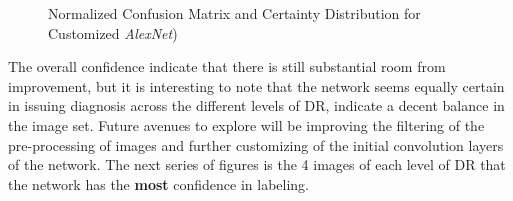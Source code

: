 \documentclass[letterpaper,12pt]{article}
\begin{document}
\begin{figure}[htbp]
\begin{center}
\caption{Normalized Confusion Matrix and Certainty Distribution for Customized \textit{AlexNet})}
\label{DR0_C}
\end{center}
\end{figure}

The overall confidence indicate that there is still substantial room from improvement, but it is interesting to note that the network seems equally certain in issuing diagnosis across the different levels of DR, indicate a decent balance in the image set. Future avenues to explore will be improving the filtering of the pre-processing of images and further customizing of the initial convolution layers of the network. The next series of figures is the 4 images of each level of DR that the network has the \textbf{most} confidence in labeling.
\end{document}
